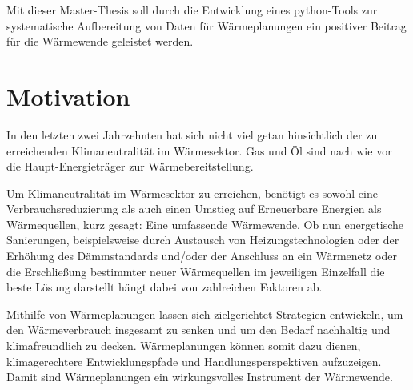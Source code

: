 	Mit dieser Master-Thesis soll durch die Entwicklung eines python-Tools zur systematische Aufbereitung von Daten für Wärmeplanungen ein positiver Beitrag für die Wärmewende geleistet werden. 
	
	
	
	
	
	
	
	

	
	
	\section{Motivation}
		
		In den letzten zwei Jahrzehnten hat sich nicht viel getan hinsichtlich der zu erreichenden Klimaneutralität im Wärmesektor. Gas und Öl sind nach wie vor die Haupt-Energieträger zur Wärmebereitstellung. \cite{Umweltbundesamt_Energieverbrauch_Wärme}
		
		Um Klimaneutralität im Wärmesektor zu erreichen, benötigt es sowohl eine Verbrauchsreduzierung als auch einen Umstieg auf Erneuerbare Energien als Wärmequellen, kurz gesagt: Eine umfassende Wärmewende. Ob nun energetische Sanierungen, beispielsweise durch Austausch von Heizungstechnologien oder der Erhöhung des Dämmstandards und/oder der Anschluss an ein Wärmenetz oder die Erschließung bestimmter neuer Wärmequellen im jeweiligen Einzelfall die beste Lösung darstellt hängt dabei von zahlreichen Faktoren ab.
		
		Mithilfe von Wärmeplanungen lassen sich zielgerichtet Strategien entwickeln, um den Wärmeverbrauch insgesamt zu senken und um den Bedarf nachhaltig und klimafreundlich zu decken. Wärmeplanungen können somit dazu dienen, klimagerechtere Entwicklungspfade und Handlungsperspektiven aufzuzeigen. Damit sind Wärmeplanungen ein wirkungsvolles Instrument der Wärmewende.  
		
